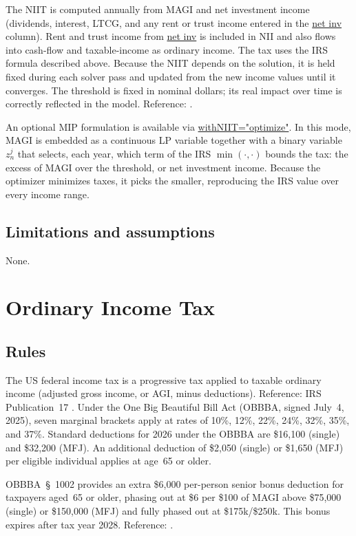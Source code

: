 \documentclass[fleqn,12pt]{report}
\newcommand{\code}[1]{\url{#1}}
\begin{document}
The NIIT is computed annually from MAGI and net investment income (dividends,
interest, LTCG, and any rent or trust income entered in the \code{net inv}
column).
Rent and trust income from \code{net inv} is included in NII and also flows
into cash-flow and taxable-income as ordinary income.
The tax uses the IRS formula described above.
Because the NIIT depends on the solution, it is held fixed during each solver
pass and updated from the new income values until it converges.
The threshold is fixed in nominal dollars; its real impact over time is
correctly reflected in the model.
Reference: \cite{irc1411}.

An optional MIP formulation is available via \code{withNIIT="optimize"}.
In this mode, MAGI is embedded as a continuous LP variable together with a
binary variable $z^j_n$ that selects, each year, which term of the IRS
$\min(\cdot,\cdot)$ bounds the tax: the excess of MAGI over the threshold, or
net investment income. Because the optimizer minimizes taxes, it picks the
smaller, reproducing the IRS value over every income range.

\subsection*{Limitations and assumptions}

None.

\section{Ordinary Income Tax}
\label{sec:ordincome}

\subsection*{Rules}

The US federal income tax is a progressive tax applied to taxable ordinary
income (adjusted gross income, or AGI, minus deductions).
Reference: IRS Publication~17 \cite{irs17}.
Under the One Big Beautiful Bill Act (OBBBA, signed July~4, 2025), seven
marginal brackets apply at rates of 10\%, 12\%, 22\%, 24\%, 32\%, 35\%,
and 37\%.
Standard deductions for 2026 under the OBBBA are \$16,100 (single) and
\$32,200 (MFJ).
An additional deduction of \$2,050 (single) or \$1,650 (MFJ) per eligible
individual applies at age~65 or older.

OBBBA~§~1002 provides an extra \$6,000 per-person senior bonus deduction
for taxpayers aged~65 or older, phasing out at \$6 per \$100 of MAGI above
\$75,000 (single) or \$150,000 (MFJ) and fully phased out at \$175k/\$250k.
This bonus expires after tax year 2028.
Reference: \cite{obbba2025}.
\end{document}
